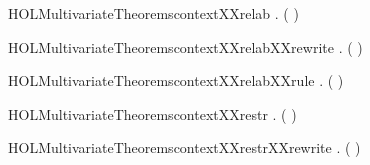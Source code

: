 \newcommand{\HOLMultivariateTheoremscontextXXrec}{\UseVerbatim{HOLMultivariateTheoremscontextXXrec}}
\begin{SaveVerbatim}{HOLMultivariateTheoremscontextXXrelab}
\HOLTokenTurnstile{} \HOLSymConst{\HOLTokenForall{}}  .   (  ) \HOLSymConst{\HOLTokenImp{}}   
\end{SaveVerbatim}
\newcommand{\HOLMultivariateTheoremscontextXXrelab}{\UseVerbatim{HOLMultivariateTheoremscontextXXrelab}}
\begin{SaveVerbatim}{HOLMultivariateTheoremscontextXXrelabXXrewrite}
\HOLTokenTurnstile{} \HOLSymConst{\HOLTokenForall{}}  .   (  ) \HOLSymConst{\HOLTokenEquiv{}}   
\end{SaveVerbatim}
\newcommand{\HOLMultivariateTheoremscontextXXrelabXXrewrite}{\UseVerbatim{HOLMultivariateTheoremscontextXXrelabXXrewrite}}
\begin{SaveVerbatim}{HOLMultivariateTheoremscontextXXrelabXXrule}
\HOLTokenTurnstile{} \HOLSymConst{\HOLTokenForall{}}  .    \HOLSymConst{\HOLTokenImp{}}   (  )
\end{SaveVerbatim}
\newcommand{\HOLMultivariateTheoremscontextXXrelabXXrule}{\UseVerbatim{HOLMultivariateTheoremscontextXXrelabXXrule}}
\begin{SaveVerbatim}{HOLMultivariateTheoremscontextXXrestr}
\HOLTokenTurnstile{} \HOLSymConst{\HOLTokenForall{}}  .   (\HOLConst{\ensuremath{\nu}}  ) \HOLSymConst{\HOLTokenImp{}}   
\end{SaveVerbatim}
\newcommand{\HOLMultivariateTheoremscontextXXrestr}{\UseVerbatim{HOLMultivariateTheoremscontextXXrestr}}
\begin{SaveVerbatim}{HOLMultivariateTheoremscontextXXrestrXXrewrite}
\HOLTokenTurnstile{} \HOLSymConst{\HOLTokenForall{}}  .   (\HOLConst{\ensuremath{\nu}}  ) \HOLSymConst{\HOLTokenEquiv{}}   
\end{SaveVerbatim}
